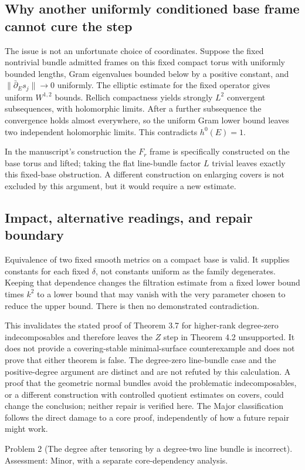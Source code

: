 \documentclass[10pt]{article}
\begin{document}
\subsection*{Why another uniformly conditioned base frame cannot cure the step}
The issue is not an unfortunate choice of coordinates. Suppose the fixed nontrivial bundle admitted frames on this fixed compact torus with uniformly bounded lengths, Gram eigenvalues bounded below by a positive constant, and \(\|\bar\partial_E s_j\|\to0\) uniformly. The elliptic estimate for the fixed operator gives uniform \(W^{1,2}\) bounds. Rellich compactness yields strongly \(L^2\) convergent subsequences, with holomorphic limits. After a further subsequence the convergence holds almost everywhere, so the uniform Gram lower bound leaves two independent holomorphic limits. This contradicts \(h^0(E)=1\).\par
In the manuscript’s construction the \(F_r\) frame is specifically constructed on the base torus and lifted; taking the flat line-bundle factor \(L\) trivial leaves exactly this fixed-base obstruction. A different construction on enlarging covers is not excluded by this argument, but it would require a new estimate.\par
\subsection*{Impact, alternative readings, and repair boundary}
Equivalence of two fixed smooth metrics on a compact base is valid. It supplies constants for each fixed \(\delta\), not constants uniform as the family degenerates. Keeping that dependence changes the filtration estimate from a fixed lower bound times \(k^2\) to a lower bound that may vanish with the very parameter chosen to reduce the upper bound. There is then no demonstrated contradiction.\par
This invalidates the stated proof of Theorem 3.7 for higher-rank degree-zero indecomposables and therefore leaves the \(Z\) step in Theorem 4.2 unsupported. It does not provide a covering-stable minimal-surface counterexample and does not prove that either theorem is false. The degree-zero line-bundle case and the positive-degree argument are distinct and are not refuted by this calculation. A proof that the geometric normal bundles avoid the problematic indecomposables, or a different construction with controlled quotient estimates on covers, could change the conclusion; neither repair is verified here. The Major classification follows the direct damage to a core proof, independently of how a future repair might work.\par
Problem 2 (The degree after tensoring by a degree-two line bundle is incorrect).  Assessment: Minor, with a separate core-dependency analysis.\par
\end{document}
